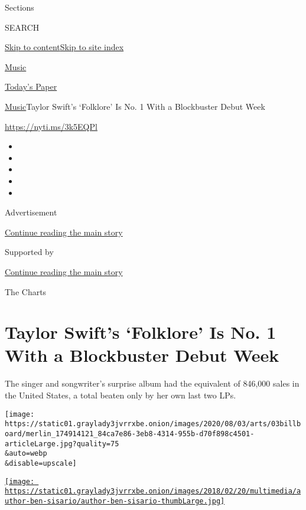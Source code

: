 Sections

SEARCH

\protect\hyperlink{site-content}{Skip to
content}\protect\hyperlink{site-index}{Skip to site index}

\href{https://www.nytimes3xbfgragh.onion/section/arts/music}{Music}

\href{https://myaccount.nytimes3xbfgragh.onion/auth/login?response_type=cookie\&client_id=vi}{}

\href{https://www.nytimes3xbfgragh.onion/section/todayspaper}{Today's
Paper}

\href{/section/arts/music}{Music}\textbar{}Taylor Swift's `Folklore' Is
No. 1 With a Blockbuster Debut Week

\href{https://nyti.ms/3k5EQPl}{https://nyti.ms/3k5EQPl}

\begin{itemize}
\item
\item
\item
\item
\item
\end{itemize}

Advertisement

\protect\hyperlink{after-top}{Continue reading the main story}

Supported by

\protect\hyperlink{after-sponsor}{Continue reading the main story}

The Charts

\hypertarget{taylor-swifts-folklore-is-no-1-with-a-blockbuster-debut-week}{%
\section{Taylor Swift's `Folklore' Is No. 1 With a Blockbuster Debut
Week}\label{taylor-swifts-folklore-is-no-1-with-a-blockbuster-debut-week}}

The singer and songwriter's surprise album had the equivalent of 846,000
sales in the United States, a total beaten only by her own last two LPs.

\texttt{[image: https://static01.graylady3jvrrxbe.onion/images/2020/08/03/arts/03billboard/merlin\_174914121\_84ca7e86-3eb8-4314-955b-d70f898c4501-articleLarge.jpg?quality=75\\\&auto=webp\\\&disable=upscale]}

\href{https://www.nytimes3xbfgragh.onion/by/ben-sisario}{\texttt{[image: https://static01.graylady3jvrrxbe.onion/images/2018/02/20/multimedia/author-ben-sisario/author-ben-sisario-thumbLarge.jpg]}}

